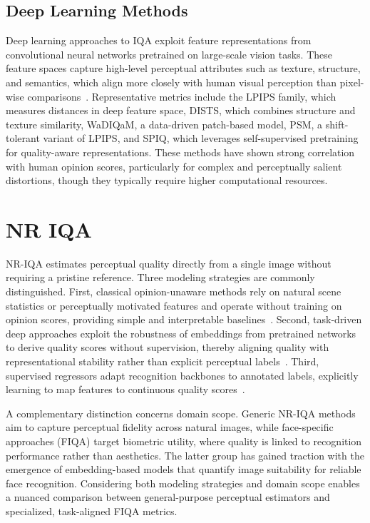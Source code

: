 \subsection{Deep Learning Methods}\label{sec:deep_metrics}

Deep learning approaches to \acs{IQA} exploit feature representations from convolutional neural networks pretrained on large-scale vision tasks. 
These feature spaces capture high-level perceptual attributes such as texture, structure, and semantics, which align more closely with human visual perception than pixel-wise comparisons~\cite{gatys2016image,johnson2016perceptual,zhang2018lpips}. 
Representative metrics include the \acf{LPIPS} family, which measures distances in deep feature space, \acf{DISTS}, which combines structure and texture similarity, \acf{WaDIQaM}, a data-driven patch-based model, \acf{PSM}, a shift-tolerant variant of \acs{LPIPS}, and \acf{SPIQ}, which leverages self-supervised pretraining for quality-aware representations. 
These methods have shown strong correlation with human opinion scores, particularly for complex and perceptually salient distortions, though they typically require higher computational resources.

\section{\acl{NR} \acs{IQA}}\label{sec:no_reference_iqa}

\acs{NR-IQA} estimates perceptual quality directly from a single image without requiring a pristine reference. Three modeling strategies are commonly distinguished. First, classical opinion-unaware methods rely on natural scene statistics or perceptually motivated features and operate without training on opinion scores, providing simple and interpretable baselines~\cite{mittal2012niqe,venka2015piqe}. Second, task-driven deep approaches exploit the robustness of embeddings from pretrained networks to derive quality scores without supervision, thereby aligning quality with representational stability rather than explicit perceptual labels~\cite{terhorst2020serfiq}. Third, supervised regressors adapt recognition backbones to annotated labels, explicitly learning to map features to continuous quality scores~\cite{hernandez2019faceqnet,meng2021magface}.  

A complementary distinction concerns domain scope. Generic \acs{NR-IQA} methods aim to capture perceptual fidelity across natural images, while face-specific approaches (\acs{FIQA}) target biometric utility, where quality is linked to recognition performance rather than aesthetics. The latter group has gained traction with the emergence of embedding-based models that quantify image suitability for reliable face recognition. Considering both modeling strategies and domain scope enables a nuanced comparison between general-purpose perceptual estimators and specialized, task-aligned \acs{FIQA} metrics.

